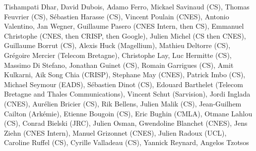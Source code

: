Tishampati Dhar, David Dubois, Adamo Ferro, Mickael Savinaud (CS), Thomas Feuvrier (CS), S\'ebastien Harasse (CS), Vincent Poulain (CNES), Antonio Valentino, Jan Wegner, Guillaume Pasero (CNES Intern, then CS), Emmanuel Christophe (CNES, then CRISP, then Google), Julien Michel (CS then CNES), Guillaume Borrut (CS), Alexis Huck (Magellium), Mathieu Deltorre (CS), Gr\'egoire Mercier (Telecom Bretagne), Christophe Lay, Luc Hermitte (CS), Massimo Di Stefano, Jonathan Guinet (CS), Romain Garrigues (CS), Amit Kulkarni, Aik Song Chia (CRISP), Stephane May (CNES), Patrick Imbo (CS), Michael Seymour (EADS), S\'ebastien Dinot (CS), Edouard Barthelet (Telecom Bretagne and Thales Communications), Vincent Schut (Sarvision), Jordi Inglada (CNES), Aur\'elien Bricier (CS), Rik Bellens, Julien Malik (CS), Jean-Guilhem Cailton (Ark\'emie), Etienne Bougoin (CS), Eric Bughin (CMLA), Otmane Lahlou (CS), Conrad Bielski (JRC), Julien Osman, Gwendoline Blanchet (CNES), Jens Ziehn (CNES Intern), Manuel Grizonnet (CNES), Julien Radoux (UCL), Caroline Ruffel (CS), Cyrille Valladeau (CS), Yannick Reynard, Angelos Tzotsos